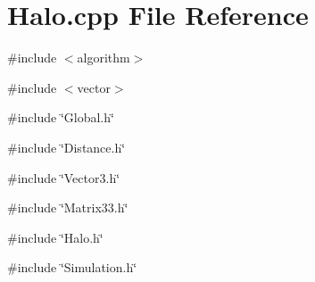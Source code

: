 \section{Halo.cpp File Reference}
\label{Halo_8cpp}
{\ttfamily \#include $<$algorithm$>$}\par
{\ttfamily \#include $<$vector$>$}\par
{\ttfamily \#include \char`\"{}Global.h\char`\"{}}\par
{\ttfamily \#include \char`\"{}Distance.h\char`\"{}}\par
{\ttfamily \#include \char`\"{}Vector3.h\char`\"{}}\par
{\ttfamily \#include \char`\"{}Matrix33.h\char`\"{}}\par
{\ttfamily \#include \char`\"{}Halo.h\char`\"{}}\par
{\ttfamily \#include \char`\"{}Simulation.h\char`\"{}}\par
